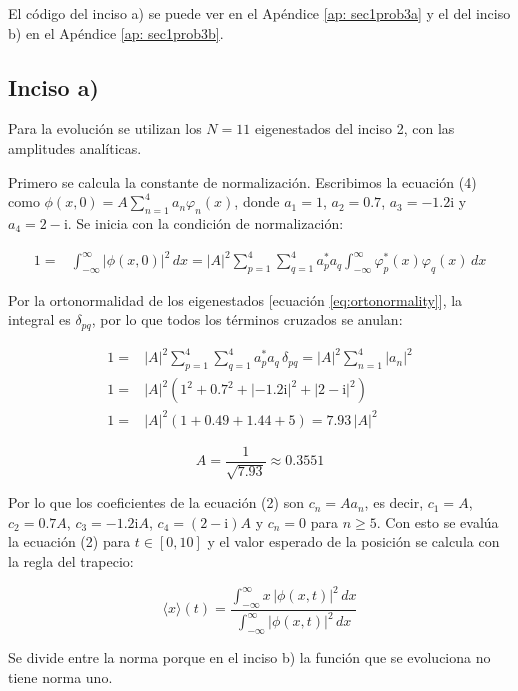 El código del inciso a) se puede ver en el Apéndice \ref{ap: sec1prob3a} y el del inciso b) en el Apéndice \ref{ap: sec1prob3b}.
\subsection*{Inciso a)}

Para la evolución se utilizan los $N=11$ eigenestados del inciso 2, con las amplitudes analíticas.

Primero se calcula la constante de normalización. Escribimos la ecuación (4) como $\phi(x,0)=A\sum_{n=1}^{4}a_n\varphi_n(x)$, donde $a_1=1$, $a_2=0.7$, $a_3=-1.2\mathrm{i}$ y $a_4=2-\mathrm{i}$. Se inicia con la condición de normalización:

\begin{align}
    1 =& \int_{-\infty}^{\infty}|\phi(x,0)|^2\,dx = |A|^2\sum_{p=1}^{4}\sum_{q=1}^{4}a_p^*a_q\int_{-\infty}^{\infty}\varphi_p^*(x)\varphi_q(x)\,dx
\end{align}

Por la ortonormalidad de los eigenestados [ecuación \ref{eq:ortonormality}], la integral es $\delta_{pq}$, por lo que todos los términos cruzados se anulan:

\begin{align}
    1 =& |A|^2\sum_{p=1}^{4}\sum_{q=1}^{4}a_p^*a_q\,\delta_{pq} = |A|^2\sum_{n=1}^{4}|a_n|^2 \\
    1 =& |A|^2\left(1^2+0.7^2+|-1.2\mathrm{i}|^2+|2-\mathrm{i}|^2\right) \\
    1 =& |A|^2\left(1+0.49+1.44+5\right) = 7.93\,|A|^2
\end{align}

\begin{equation}
    \boxed{A=\frac{1}{\sqrt{7.93}}\approx 0.3551}
\end{equation}

Por lo que los coeficientes de la ecuación (2) son $c_n=Aa_n$, es decir, $c_1=A$, $c_2=0.7A$, $c_3=-1.2\mathrm{i}A$, $c_4=(2-\mathrm{i})A$ y $c_n=0$ para $n\geq5$. Con esto se evalúa la ecuación (2) para $t\in[0,10]$ y el valor esperado de la posición se calcula con la regla del trapecio:

\begin{equation}
    \langle x\rangle(t) = \frac{\int_{-\infty}^{\infty}x\,|\phi(x,t)|^2\,dx}{\int_{-\infty}^{\infty}|\phi(x,t)|^2\,dx}
    \label{eq: valor esperado x}
\end{equation}

Se divide entre la norma porque en el inciso b) la función que se evoluciona no tiene norma uno.

